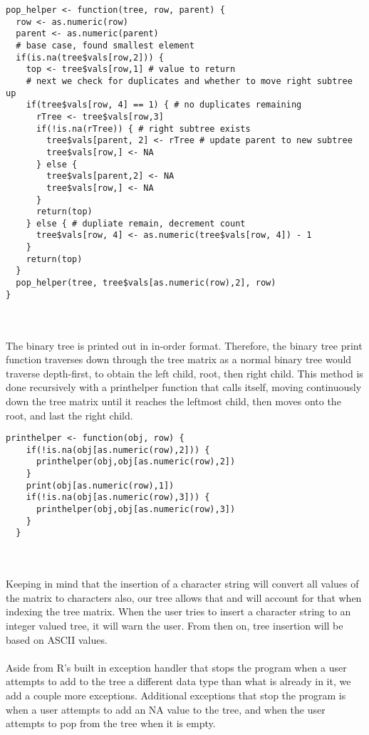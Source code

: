\documentclass{article}
\begin{document}
\begin{lstlisting}
pop_helper <- function(tree, row, parent) {
  row <- as.numeric(row)
  parent <- as.numeric(parent)
  # base case, found smallest element
  if(is.na(tree$vals[row,2])) { 
    top <- tree$vals[row,1] # value to return
    # next we check for duplicates and whether to move right subtree up
    if(tree$vals[row, 4] == 1) { # no duplicates remaining
      rTree <- tree$vals[row,3]
      if(!is.na(rTree)) { # right subtree exists
        tree$vals[parent, 2] <- rTree # update parent to new subtree
        tree$vals[row,] <- NA
      } else {
        tree$vals[parent,2] <- NA
        tree$vals[row,] <- NA
      }
      return(top)
    } else { # dupliate remain, decrement count
      tree$vals[row, 4] <- as.numeric(tree$vals[row, 4]) - 1
    }
    return(top)
  }
  pop_helper(tree, tree$vals[as.numeric(row),2], row)
}

\end{lstlisting}
\\\\ The binary tree is printed out in in-order format. Therefore, the binary tree print function traverses down through the tree matrix as a normal binary tree would traverse depth-first, to obtain the left child, root, then right child. This method is done recursively with a printhelper function that calls itself, moving continuously down the tree matrix until it reaches the leftmost child, then moves onto the root, and last the right child.
\begin{lstlisting}
printhelper <- function(obj, row) {
    if(!is.na(obj[as.numeric(row),2])) {
      printhelper(obj,obj[as.numeric(row),2])
    }
    print(obj[as.numeric(row),1])
    if(!is.na(obj[as.numeric(row),3])) {
      printhelper(obj,obj[as.numeric(row),3])
    }
  }
\end{lstlisting}
\\\\ Keeping in mind that the insertion of a character string will convert all values of the matrix to characters also, our tree allows that and will account for that when indexing the tree matrix. When the user tries to insert a character string to an integer valued tree, it will warn the user. From then on, tree insertion will be based on ASCII values.
\\\\Aside from R's built in exception handler that stops the program when a  user attempts to add to the tree a different data type than what is already in it, we add a couple more exceptions. Additional exceptions that stop the program is when a user attempts to add an NA value to the tree, and when the user attempts to pop from the tree when it is empty.
\end{document}
